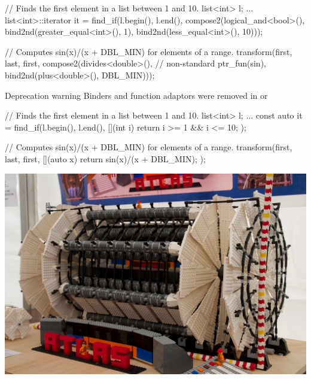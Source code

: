 \begin{frame}[fragile]
  \begin{cppcode}
    // Finds the first element in a list between 1 and 10.
    list<int> l;
    ...
    list<int>::iterator it =
      find_if(l.begin(), l.end(),
              compose2(logical_and<bool>(),
                       bind2nd(greater_equal<int>(), 1),
                       bind2nd(less_equal<int>(), 10)));

    // Computes sin(x)/(x + DBL_MIN) for elements of a range.
    transform(first, last, first,
              compose2(divides<double>(), // non-standard
                       ptr_fun(sin),
                       bind2nd(plus<double>(), DBL_MIN)));
  \end{cppcode}
  \begin{alertblock}{Deprecation warning}
  	Binders and function adaptors were removed in  or 
  \end{alertblock}
\end{frame}

\begin{frame}[fragile]
  \begin{cppcode}
    // Finds the first element in a list between 1 and 10.
    list<int> l;
    ...
    const auto it =
      find_if(l.begin(), l.end(),
        [](int i) { return i >= 1 && i <= 10; });

    // Computes sin(x)/(x + DBL_MIN) for elements of a range.
    transform(first, last, first,
      [](auto x) { return sin(x)/(x + DBL_MIN); });
  \end{cppcode}
\end{frame}

\begin{frame}[fragile]
  \begin{block}{}
    \includegraphics[width=\linewidth]{morelanguage/AtlasLego}
  \end{block}
\end{frame}

